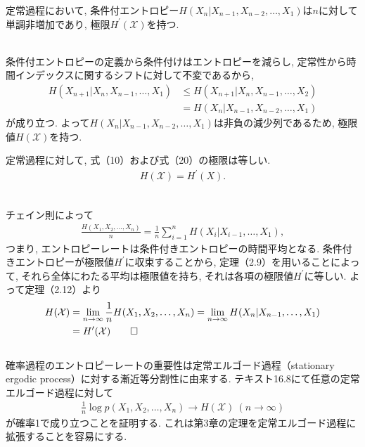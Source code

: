 \documentclass[a4j]{jsarticle}
\begin{document}
\begin{itembox}[l]{}
	定常過程において, 条件付エントロピー$H(X_n | X_{n-1}, X_{n-2}, \ldots, X_1)$は$n$に対して単調非増加であり, 極限$H^\prime(\mathcal{X})$を持つ.
\end{itembox}\\

 条件付エントロピーの定義から条件付けはエントロピーを減らし, 定常性から時間インデックスに関するシフトに対して不変であるから,
\begin{align}
	H(X_{n+1} | X_n, X_{n-1}, \ldots, X_1)
	 & \leq H(X_{n+1} | X_n, X_{n-1}, \ldots, X_2) \\
	 & = H(X_n | X_{n-1}, X_{n-2}, \ldots, X_1)
\end{align}
が成り立つ. よって$H(X_n | X_{n-1}, X_{n-2}, \ldots, X_1)$は非負の減少列であるため, 極限値$H(\mathcal{X})$を持つ.\\

\begin{itembox}[l]{}
	定常過程に対して, 式（10）および式（20）の極限は等しい.
	\begin{align}
		H(\mathcal{X}) = H^\prime(X).
	\end{align}
\end{itembox}\\

 チェイン則によって
\begin{align}
	\frac{H(X_1, X_2, \ldots, X_n)}{n} = \frac{1}{n} \sum_{i=1}^{n} H(X_i | X_{i-1}, \ldots, X_1),
\end{align}
つまり, エントロピーレートは条件付きエントロピーの時間平均となる. 条件付きエントロピーが極限値$H^\prime$に収束することから, 定理（2.9）を用いることによって, それら全体にわたる平均は極限値を持ち, それは各項の極限値$H^\prime$に等しい. よって定理（2.12）より
\begin{align}
	H(\mathcal{X}) & = \lim_{n \rightarrow \infty} \frac{1}{n} H(X_1, X_2, \ldots, X_n) = \lim_{n \rightarrow \infty} H(X_n | X_{n-1}, \ldots, X_1) \\
	               & = H^\prime(\mathcal{X})\qed
\end{align}\\

 確率過程のエントロピーレートの重要性は定常エルゴード過程（stationary ergodic process）に対する漸近等分割性に由来する. テキスト\cite{text}16.8にて任意の定常エルゴード過程に対して
\begin{align}
	\frac{1}{n}\log p(X_1, X_2, \ldots, X_n) \rightarrow H(\mathcal{X}) \: (n \rightarrow \infty)
\end{align}
が確率1で成り立つことを証明する. これは第3章の定理を定常エルゴード過程に拡張することを容易にする.\\
\end{document}
